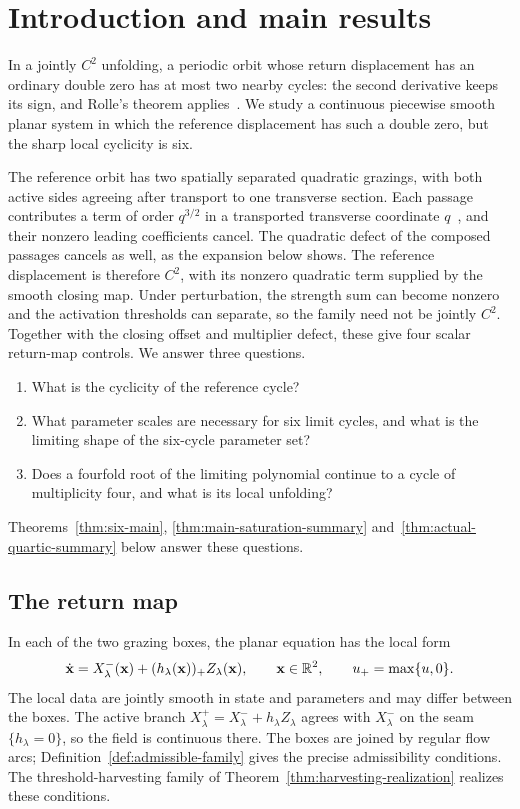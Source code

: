 \section{Introduction and main results}\label{sec:introduction}

In a jointly $C^2$ unfolding, a periodic orbit whose return displacement
has an ordinary double zero has at most two nearby cycles: the second
derivative keeps its sign, and Rolle's theorem applies~\cite{roussarie1998}.
We study a continuous piecewise smooth planar system in which the reference
displacement has such a double zero, but the sharp local cyclicity is six.

The reference orbit has two spatially separated quadratic grazings, with both
active sides agreeing after transport to one transverse section. Each
passage contributes a term of order $q^{3/2}$ in a transported transverse
coordinate $q$~\cite{dibbc2001,nordmark2002}, and their nonzero leading
coefficients cancel. The quadratic defect of the composed passages cancels
as well, as the expansion below shows. The reference displacement is therefore $C^2$, with
its nonzero quadratic term supplied by the smooth closing map. Under
perturbation, the strength sum can become nonzero and the activation
thresholds can separate, so the family need not be jointly $C^2$.
Together with the closing offset and multiplier defect, these give four
scalar return-map controls. We answer three questions.
\begin{enumerate}
\item[(Q1)] What is the cyclicity of the reference cycle?
\item[(Q2)] What parameter scales are necessary for six limit cycles,
and what is the limiting shape of the six-cycle parameter set?
\item[(Q3)] Does a fourfold root of the limiting polynomial continue
to a cycle of multiplicity four, and what is its local unfolding?
\end{enumerate}
Theorems~\ref{thm:six-main}, \ref{thm:main-saturation-summary}
and~\ref{thm:actual-quartic-summary} below answer these questions.

\subsection{The return map}

In each of the two grazing boxes, the planar equation has the local form
\[
 \dot{\mathbf{x}}=X^-_\lambda(\mathbf{x})
 +(h_\lambda(\mathbf{x}))_+Z_\lambda(\mathbf{x}),
 \qquad \mathbf{x}\in\mathbb R^2,\qquad u_+=\max\{u,0\}.
\]
The local data are jointly smooth in state and parameters and may differ
between the boxes. The active branch
$X^+_\lambda=X^-_\lambda+h_\lambda Z_\lambda$ agrees with $X^-_\lambda$
on the seam $\{h_\lambda=0\}$, so the field is continuous there.
The boxes are joined by regular flow arcs; Definition~\ref{def:admissible-family}
gives the precise admissibility conditions. The threshold-harvesting family
of Theorem~\ref{thm:harvesting-realization} realizes these conditions.

